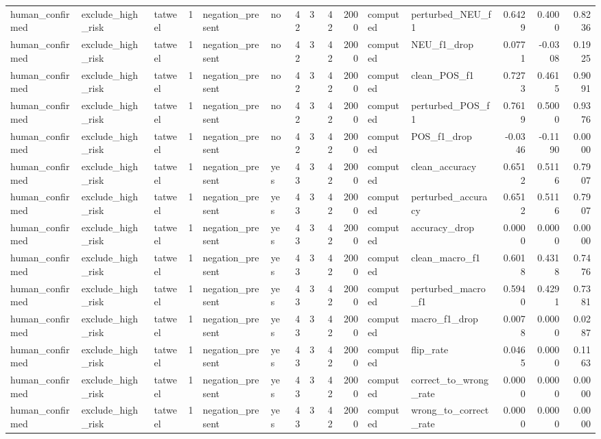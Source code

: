 \begin{tabular}{lllrllrrrrllrrr}
human_confirmed & exclude_high_risk & tatweel & 1 & negation_present & no & 42 & 3 & 42 & 2000 & computed & perturbed_NEU_f1 & 0.6429 & 0.4000 & 0.8236 \\
human_confirmed & exclude_high_risk & tatweel & 1 & negation_present & no & 42 & 3 & 42 & 2000 & computed & NEU_f1_drop & 0.0771 & -0.0308 & 0.1925 \\
human_confirmed & exclude_high_risk & tatweel & 1 & negation_present & no & 42 & 3 & 42 & 2000 & computed & clean_POS_f1 & 0.7273 & 0.4615 & 0.9091 \\
human_confirmed & exclude_high_risk & tatweel & 1 & negation_present & no & 42 & 3 & 42 & 2000 & computed & perturbed_POS_f1 & 0.7619 & 0.5000 & 0.9376 \\
human_confirmed & exclude_high_risk & tatweel & 1 & negation_present & no & 42 & 3 & 42 & 2000 & computed & POS_f1_drop & -0.0346 & -0.1190 & 0.0000 \\
human_confirmed & exclude_high_risk & tatweel & 1 & negation_present & yes & 43 & 3 & 42 & 2000 & computed & clean_accuracy & 0.6512 & 0.5116 & 0.7907 \\
human_confirmed & exclude_high_risk & tatweel & 1 & negation_present & yes & 43 & 3 & 42 & 2000 & computed & perturbed_accuracy & 0.6512 & 0.5116 & 0.7907 \\
human_confirmed & exclude_high_risk & tatweel & 1 & negation_present & yes & 43 & 3 & 42 & 2000 & computed & accuracy_drop & 0.0000 & 0.0000 & 0.0000 \\
human_confirmed & exclude_high_risk & tatweel & 1 & negation_present & yes & 43 & 3 & 42 & 2000 & computed & clean_macro_f1 & 0.6018 & 0.4318 & 0.7476 \\
human_confirmed & exclude_high_risk & tatweel & 1 & negation_present & yes & 43 & 3 & 42 & 2000 & computed & perturbed_macro_f1 & 0.5940 & 0.4291 & 0.7381 \\
human_confirmed & exclude_high_risk & tatweel & 1 & negation_present & yes & 43 & 3 & 42 & 2000 & computed & macro_f1_drop & 0.0078 & 0.0000 & 0.0287 \\
human_confirmed & exclude_high_risk & tatweel & 1 & negation_present & yes & 43 & 3 & 42 & 2000 & computed & flip_rate & 0.0465 & 0.0000 & 0.1163 \\
human_confirmed & exclude_high_risk & tatweel & 1 & negation_present & yes & 43 & 3 & 42 & 2000 & computed & correct_to_wrong_rate & 0.0000 & 0.0000 & 0.0000 \\
human_confirmed & exclude_high_risk & tatweel & 1 & negation_present & yes & 43 & 3 & 42 & 2000 & computed & wrong_to_correct_rate & 0.0000 & 0.0000 & 0.0000 \\

\end{tabular}
